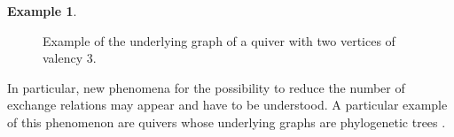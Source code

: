 \documentclass[letter,11pt]{amsart}
\theoremstyle{theorem}
\theoremstyle{definition}
\newtheorem{example}[Thm]{Example}
\numberwithin{equation}{section}
\begin{document}
\begin{example}
\begin{figure}[h!]
{\begin{tikzpicture}[-,>=stealth',shorten >=1pt,auto,node distance=1.5cm, thick,main node/.style={circle,draw,white}]
			\end{tikzpicture}		
	}
	\caption{Example of the underlying graph of a quiver with two vertices of valency $ 3 $.}
	\label{Fig:beyond1}
	\end{figure}
	
	In particular, new phenomena for the possibility to reduce the number of exchange relations may appear and have to be understood.
	A particular example of this phenomenon are quivers whose underlying graphs are phylogenetic trees \cite{phylo}.  
\end{example}
\end{document}
